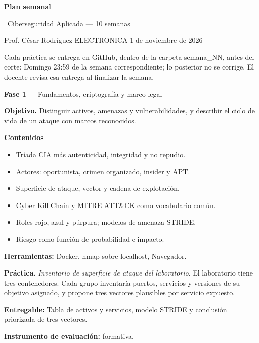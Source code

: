 \documentclass[11pt,a4paper]{article}
\newcommand{\iconoBanda}{microchip}
\newcommand{\bandaTitulo}[3][fondoOscuro]{%
  \begin{tcolorbox}[
    enhanced,
    colback=#1, colframe=#1,
    boxrule=0pt, arc=8pt, outer arc=8pt,
    width=\linewidth,
    top=18pt, bottom=6pt, left=14pt, right=14pt,
    borderline south={3.5pt}{0pt}{cyanNeon},
  ]
    \begin{minipage}[c]{0.07\linewidth}
      \centering
      \textcolor{cyanNeon}{\fontsize{30}{30}\selectfont\faIcon{\iconoBanda}}
    \end{minipage}%
    \hspace{8pt}%
    \begin{minipage}[c]{0.88\linewidth}
      {\fontsize{20}{24}\selectfont\bfseries\color{white}#2}\par\vspace{5pt}%
      \textcolor{cyanNeon!80!white}{\small\faIcon{angle-right}~#3}%
    \end{minipage}
    \vspace{4pt}
  \end{tcolorbox}%
  \vspace{8pt}%
}
\renewcommand{\iconoBanda}{shield-alt}
\begin{document}
\bandaTitulo[fondoOscuro]{Plan semanal}{Ciberseguridad Aplicada --- 10 semanas}

\begin{center}\small\color{grisTexto}Prof. César Rodríguez \textbar{} ELECTRONICA \textbar{} 1 de noviembre de 2026\end{center}

Cada práctica se entrega en GitHub, dentro de la carpeta semana\_NN, antes del corte: Domingo 23:59 de la semana correspondiente; lo posterior no se corrige. El docente revisa esa entrega al finalizar la semana.

\begin{tcolorbox}[cajaContenido,title={Semana 1 --- Panorama de la ciberseguridad y superficie de ataque}]
\textbf{Fase 1} --- Fundamentos, criptografía y marco legal

\textbf{Objetivo.} Distinguir activos, amenazas y vulnerabilidades, y describir el ciclo de vida de un ataque con marcos reconocidos.

\textbf{Contenidos}

\begin{itemize}[leftmargin=1.4em,itemsep=2pt,topsep=3pt]
  \item Tríada CIA más autenticidad, integridad y no repudio.
  \item Actores: oportunista, crimen organizado, insider y APT.
  \item Superficie de ataque, vector y cadena de explotación.
  \item Cyber Kill Chain y MITRE ATT\&CK como vocabulario común.
  \item Roles rojo, azul y púrpura; modelos de amenaza STRIDE.
  \item Riesgo como función de probabilidad e impacto.
\end{itemize}

\textbf{Herramientas:} Docker, nmap sobre localhost, Navegador.

\textbf{Práctica.} \emph{Inventario de superficie de ataque del laboratorio}. El laboratorio tiene tres contenedores. Cada grupo inventaría puertos, servicios y versiones de su objetivo asignado, y propone tres vectores plausibles por servicio expuesto.


\textbf{Entregable:} Tabla de activos y servicios, modelo STRIDE y conclusión priorizada de tres vectores.

\textbf{Instrumento de evaluación:} formativa.
\end{tcolorbox}
\end{document}

